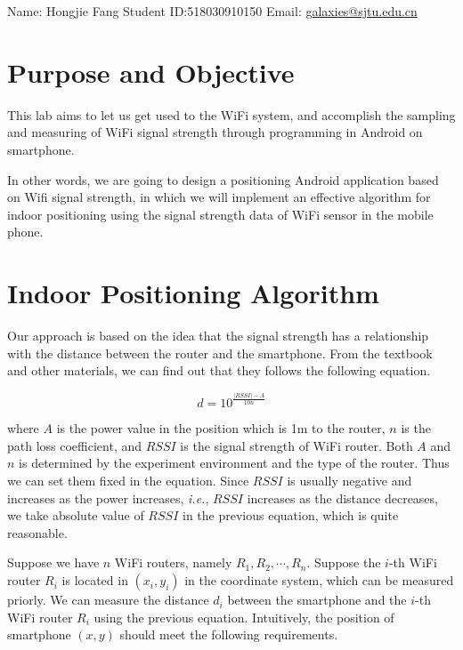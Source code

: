 \documentclass[12pt, a4paper]{article}
\theoremstyle{definition}
\begin{document}
\noindent

\noindent{}
\begin{center}

Name: Hongjie Fang  \quad Student ID:518030910150 \quad Email: \href{mailto:galaxies@sjtu.edu.cn}{galaxies@sjtu.edu.cn}
\end{center}

\section{Purpose and Objective}\label{section1}
This lab aims to let us get used to the WiFi system, and accomplish the sampling and measuring of WiFi signal strength through programming in Android on smartphone. 

In other words, we are going to design a positioning Android application based on Wifi signal strength, in which we will implement an effective algorithm for indoor positioning using the signal strength data of WiFi sensor in the mobile phone.

\section{Indoor Positioning Algorithm}\label{section2}
Our approach is based on the idea that the signal strength has a relationship with the distance between the router and the smartphone. From the textbook and other materials, we can find out that they follows the following equation.

$$
d = 10^{\frac{|RSSI| - A}{10n}}
$$

\noindent where $A$ is the power value in the position which is 1m to the router,  $n$ is the path loss coefficient, and $RSSI$ is the signal strength of WiFi router. Both $A$ and $n$ is determined by the experiment environment and the type of the router. Thus we can set them fixed in the equation. Since $RSSI$ is usually negative and increases as the power increases, \textit{i.e.}, $RSSI$ increases as the distance decreases, we take absolute value of $RSSI$ in the previous equation, which is quite reasonable.

Suppose we have $n$ WiFi routers, namely $R_1, R_2, \cdots, R_n$. Suppose the $i$-th WiFi router $R_i$ is located in $(x_i, y_i)$ in the coordinate system, which can be measured priorly. We can measure the distance $d_i$ between the smartphone and the $i$-th WiFi router $R_i$ using the previous equation. Intuitively, the position of smartphone $(x, y)$ should meet the following requirements.
\end{document}
